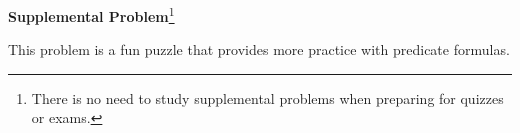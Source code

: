 \documentclass[handout]{mcs}
\begin{document}



\begin{center}
\textbf{Supplemental Problem}\footnote{There is no need to study supplemental
  problems when preparing for quizzes or exams.}
\end{center}

\begin{staffnotes}
This problem is a fun puzzle that provides more practice with
predicate formulas.
\end{staffnotes}


\iffalse
\pinput{CP_variable_convention}
\pinput{PS_predicate_calculus_power_of_two}
\pinput{PS_6042_staff_cabal}
\pinput{FP_logic_of_leq}
\pinput{CP_logic_news_network}  %
\pinput{PS_emailed_exactly_2_others}  %
\pinput{PS_express_in_predicate_form}
\pinput{PS_express_predicates_in_formal_logic_notation}
\pinput{PS_predicate_calculus_power_of_prime}  %
\pinput{PS_predicate_calculus_power_of_two}
\pinput{PS_rewrite_assertions_prime_goldbach_bertrand_fermat}
\pinput{PS_translate_to_predicate_logic}
\pinput{CP_a_season_for_every_purpose}   %
\fi

\end{document}
